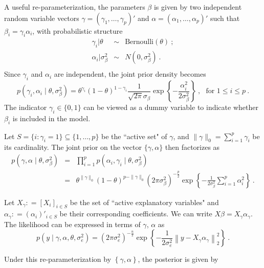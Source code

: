 \documentclass[11pt]{article}%
\numberwithin{equation}{section}
\theoremstyle{plain}
\newcommand{\defeq}{\mathrel{\mathop:}=}
\begin{document}
A useful re-parameterization, the parameters $\beta$ is given by two independent random variable vectors $\gamma = \left(\gamma_1, \ldots, \gamma_p\right)'$ and $\alpha = \left(\alpha_1, \ldots, \alpha_p\right)'$ such that $\beta_i  =  \gamma_i\alpha_i$, with probabilistic structure
\begin{equation}
\label{eq:bg}
\begin{array}{rcl}
\gamma_i|\theta & \sim & \text{Bernoulli}(\theta) \ ;
\\
\alpha_i | \sigma_\beta^2 &\sim & N\left(0, \sigma_\beta^2\right) \ .
\\
\end{array}
\end{equation}
Since $\gamma_i$ and $\alpha_i$ are independent, the joint prior density becomes
$$
p\left(\gamma_i, \alpha_i \mid \theta, \sigma_\beta^2\right) =
\theta^{\gamma_i}\left(1-\theta\right)^{1-\gamma_i}\frac{1}{\sqrt{2\pi}\sigma_\beta}\exp\left\{-\frac{\alpha_i^2}{2\sigma_\beta^2}\right\}
\ , \ \ \ \text{for } 1\leq i\leq p \ .
$$
The indicator $\gamma_i\in \{0, 1\}$ can be viewed as a dummy variable to indicate whether $\beta_i$ is included in the model. \citep{soussen2011}

Let $S = \{i: \gamma_i = 1\} \subseteq \{1, \ldots, p\}$ be the ``active set" of $\gamma$, and $\|\gamma\|_0 = \sum\limits_{i = 1}^p\gamma_i$ be its cardinality.  The joint prior on the vector $\{\gamma, \alpha\}$ then factorizes as
$$
\begin{array}{rcl}
p\left(\gamma, \alpha \mid \theta, \sigma_\beta^2\right) & = & \prod\limits_{i = 1}^p p\left(\alpha_i, \gamma_i \mid \theta, \sigma_\beta^2\right) \\
& = & 
\theta^{\|\gamma\|_0}
\left(1-\theta\right)^{p - \|\gamma\|_0}
\left(2\pi\sigma_\beta^2\right)^{-\frac p2}\exp\left\{-\frac1{2\sigma_\beta^2}\sum\limits_{i = 1}^p\alpha_i^2\right\} \ .
\end{array}
$$

Let $X_\gamma \defeq \left[X_i\right]_{i \in S}$ be the set of ``active explanatory variables" and $\alpha_\gamma \defeq \left(\alpha_i\right)'_{i \in S}$ be their corresponding coefficients.  We can write $X\beta = X_\gamma \alpha_\gamma$.  The likelihood can be expressed in terms of $\gamma$, $\alpha$ as
$$
p\left(y \mid \gamma, \alpha, \theta, \sigma_e^2\right)
=
\left(2\pi\sigma_e^2\right)^{-\frac n2}
\exp\left\{
-\frac1{2\sigma_e^2}\left\|y - X_\gamma \alpha_\gamma\right\|_2^2
\right\} \ .
$$

Under this re-parameterization by $\left\{\gamma, \alpha\right\}$, the posterior is given by
\end{document}

